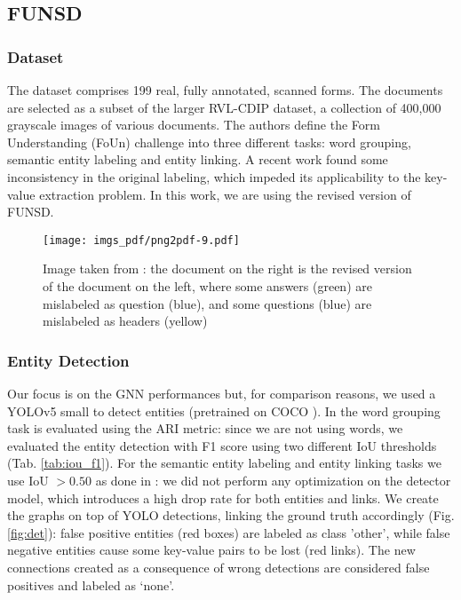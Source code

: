 \documentclass[runningheads]{llncs}
\begin{document}
\subsection{FUNSD}
\subsubsection{Dataset}
The dataset\cite{FUNSD} comprises 199 real, fully annotated, scanned forms. The documents are selected as a subset of the larger RVL-CDIP\cite{RVL-CDIP} dataset, a collection of 400,000 grayscale images of various documents. The authors define the Form Understanding (FoUn) challenge into three different tasks: word grouping, semantic entity labeling and entity linking.
A recent work \cite{revised-FUNSD} found some inconsistency in the original labeling, which impeded its applicability to the key-value extraction problem. In this work, we are using the revised version of FUNSD.
\begin{figure}[!b]
    \centering
    \texttt{[image: imgs\_pdf/png2pdf-9.pdf]}
    \caption{Image taken from \cite{revised-FUNSD}: the document on the right is the revised version of the document on the left, where some answers (green) are mislabeled as question (blue), and some questions (blue) are mislabeled as headers (yellow)}
    \label{fig:revised-funsd}
\end{figure}

\subsubsection{Entity Detection}
Our focus is on the GNN performances but, for comparison reasons, we used a YOLOv5 small \cite{YOLOv5} to detect entities (pretrained on COCO \cite{lin2014microsoft}). In \cite{FUNSD} the word grouping task is evaluated using the ARI metric: since we are not using words, we evaluated the entity detection with F1 score using two different IoU thresholds (Tab. \ref{tab:iou_f1}). For the semantic entity labeling and entity linking tasks we use IoU $>0.50$ as done in \cite{davis2021visual}: we did not perform any optimization on the detector model, which introduces a high drop rate for both entities and links. We create the graphs on top of YOLO detections, linking the ground truth accordingly (Fig. \ref{fig:det}): false positive entities (red boxes) are labeled as class 'other', while false negative entities cause some key-value pairs to be lost (red links). The new connections created as a consequence of wrong detections are considered false positives and labeled as `none'. 
\end{document}
